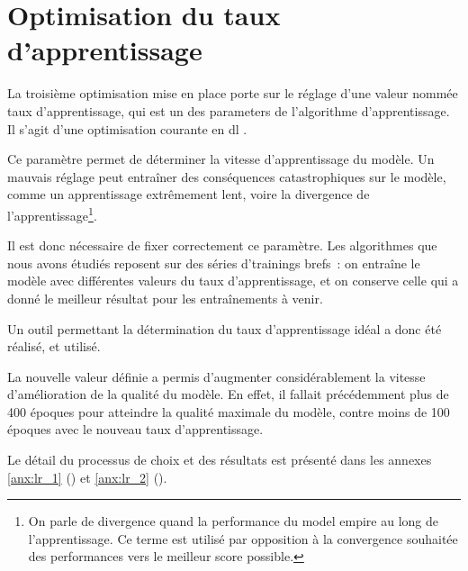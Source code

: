 \section{Optimisation du taux d'apprentissage}\label{lr_opti_papud}
La troisième optimisation mise en place porte sur le réglage d'une valeur nommée \og taux d'apprentissage\fg{}, qui est un des \glspl{parameter} de l'algorithme d'apprentissage. Il s'agit d'une optimisation courante en \gls{dl} \autocite{LearningRateOptimisation}.

Ce paramètre permet de déterminer la vitesse d'apprentissage du modèle.
Un mauvais réglage peut entraîner des conséquences catastrophiques sur le modèle, comme un apprentissage extrêmement lent, voire la divergence de l'apprentissage\footnote{On parle de divergence quand la performance du \gls{model} empire au long de l'apprentissage. Ce terme est utilisé par opposition à la convergence souhaitée des performances vers le meilleur score possible.}.

Il est donc nécessaire de fixer correctement ce paramètre.
Les algorithmes que nous avons étudiés reposent sur des séries d'\glspl{training} brefs~: on entraîne le modèle avec différentes valeurs du taux d'apprentissage, et on conserve celle qui a donné le meilleur résultat pour les entraînements à venir.

Un outil permettant la détermination du taux d'apprentissage idéal a donc été réalisé, et utilisé.

La nouvelle valeur définie a permis d'augmenter considérablement la vitesse d'amélioration de la qualité du modèle. En effet, il fallait précédemment plus de 400 époques pour atteindre la qualité maximale du modèle, contre moins de 100 époques avec le nouveau taux d'apprentissage. %

Le détail du processus de choix et des résultats est présenté dans les annexes \ref{anx:lr_1} () et \ref{anx:lr_2} ().
